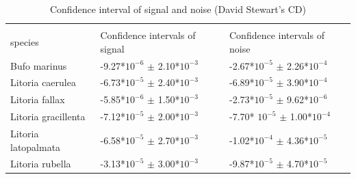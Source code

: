 \begin{table}[htb!]
\centering
\caption[Confidence interval for CD]{Confidence interval of signal and noise (David Stewart's CD)}
\label{tab:CI_CD}
\begin{tabular}{lll}
\hline\hline
    \backslashbox{Frog \\ species}{Parameters}                      & Confidence intervals of signal & Confidence intervals of noise \\ \hline
Bufo marinus        &  -9.27*$10^{-6}$ $\pm$ 2.10*$10^{-3}$ &  -2.67*$10^{-5}$ $\pm$ 2.26*$10^{-4}$                             \\ 
Litoria caerulea    &      -6.73*$10^{-5}$ $\pm$ 2.40*$10^{-3}$     &                              -6.89*$10^{-5}$ $\pm$ 3.90*$10^{-4}$ \\ 
Litoria fallax      &   -5.85*$10^{-6}$ $\pm$ 1.50*$10^{-3}$                             &                              -2.73*$10^{-5}$ $\pm$ 9.62*$10^{-6}$ \\ 
Litoria gracillenta &     -7.12*$10^{-5}$ $\pm$ 2.00*$10^{-3}$                           &                              -7.70* $10^{-5}$ $\pm$ 1.00*$10^{-4}$ \\ 
Litoria latopalmata &   -6.58*$10^{-5}$ $\pm$ 2.70*$10^{-3}$                            &                              -1.02*$10^{-4}$ $\pm$ 4.36*$10^{-5}$ \\ 
Litoria rubella     &   -3.13*$10^{-5}$ $\pm$ 3.00*$10^{-3}$                           &                              -9.87*$10^{-5}$ $\pm$ 4.70*$10^{-5}$ \\ \hline\hline
\end{tabular}
\end{table}




